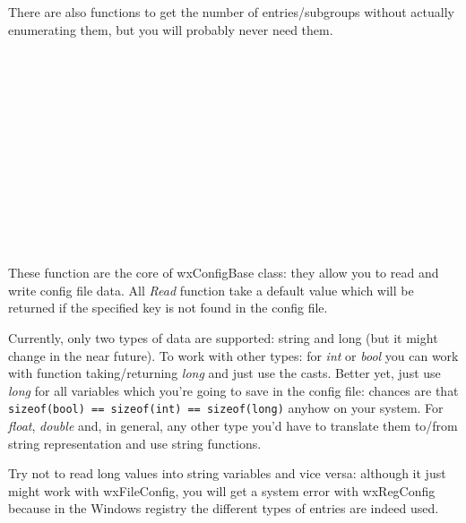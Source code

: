 There are also functions to get the number of entries/subgroups without
actually enumerating them, but you will probably never need them.

\\
\\
\\
\\
\\


\label{configtestsofexistence}

\\
\\
\\


\label{configmiscellaneous}

\\
\\


\label{configkeyaccess}

These function are the core of wxConfigBase class: they allow you to read and
write config file data. All {\it Read} function take a default value which
will be returned if the specified key is not found in the config file.

Currently, only two types of data are supported: string and long (but it might
change in the near future). To work with other types: for {\it int} or {\it
bool} you can work with function taking/returning {\it long} and just use the
casts. Better yet, just use {\it long} for all variables which you're going to
save in the config file: chances are that {\tt sizeof(bool) == sizeof(int) == sizeof(long)} anyhow on your system. For {\it float}, {\it double} and, in
general, any other type you'd have to translate them to/from string
representation and use string functions.

Try not to read long values into string variables and vice versa: although it
just might work with wxFileConfig, you will get a system error with
wxRegConfig because in the Windows registry the different types of entries are
indeed used.

